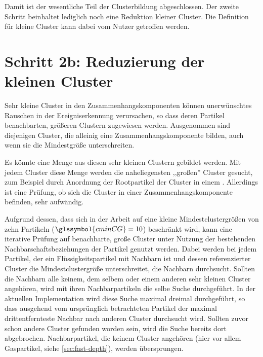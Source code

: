 Damit ist der wesentliche Teil der Clusterbildung abgeschlossen. Der zweite Schritt beinhaltet lediglich noch eine Reduktion kleiner Cluster. Die Definition für kleine Cluster kann dabei vom Nutzer getroffen werden.



\section{Schritt 2b: Reduzierung der kleinen Cluster}\label{sec:clusterreduktion}

Sehr kleine Cluster in den Zusammenhangskomponenten können unerwünschtes Rauschen in der Ereigniserkennung verursachen, so dass deren Partikel benachbarten, größeren Clustern zugewiesen werden. Ausgenommen sind diejenigen Cluster, die alleinig eine Zusammenhangskomponente bilden, auch wenn sie die Mindestgröße unterschreiten.

Es könnte eine Menge aus diesen sehr kleinen Clustern gebildet werden. Mit jedem Cluster diese Menge werden die naheliegensten ,,großen'' Cluster gesucht, zum Beispiel durch Anordnung der Rootpartikel der Cluster in einem . Allerdings ist eine Prüfung, ob sich die Cluster in einer Zusammenhangskomponente befinden, sehr aufwändig.

Aufgrund dessen, dass sich in der Arbeit auf eine kleine Mindestclustergrößen von zehn Partikeln ($\glssymbol{cminCG} = 10$) beschränkt wird, kann eine iterative Prüfung auf benachbarte, große Cluster unter Nutzung der bestehenden Nachbarschaftsbeziehungen der Partikel genutzt werden. Dabei werden bei jedem Partikel, der ein Flüssigkeitspartikel mit Nachbarn ist und dessen referenzierter Cluster die Mindestclustergröße unterschreitet, die Nachbarn durchsucht. Sollten die Nachbarn alle keinem, dem selbem oder einem anderen sehr kleinen Cluster angehören, wird mit ihren Nachbarpartikeln die selbe Suche durchgeführt. In der aktuellen Implementation wird diese Suche maximal dreimal durchgeführt, so dass ausgehend vom ursprünglich betrachteten Partikel der maximal drittentfernteste Nachbar nach anderen Cluster durchsucht wird. Sollten zuvor schon andere Cluster gefunden worden sein, wird die Suche bereits dort abgebrochen. Nachbarpartikel, die keinem Cluster angehören (hier vor allem Gaspartikel, siehe \autoref{sec:fast-depth}), werden übersprungen.

